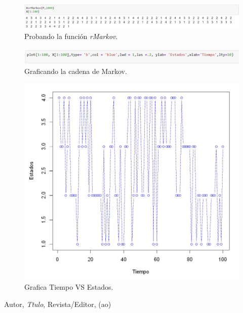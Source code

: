 \documentclass{article}
\theoremstyle{definition}
\theoremstyle{remark}
\begin{document}
\begin{figure}[!h]
	\centering
	\includegraphics[scale=0.55]{fun3}
	\caption{Probando la función \textit{rMarkov}.}
	\label{figura3}
\end{figure}

\begin{figure}[!h]
	\centering
	\includegraphics[scale=0.7]{fun4}
	\caption{Graficando la cadena de Markov.}
	\label{figura4}
\end{figure}

\begin{figure}[!h]
	\centering
	\includegraphics[scale=0.9]{fun5}
	\caption{Grafica Tiempo VS Estados.}
	\label{figura5}
\end{figure}

\begin{thebibliography}{99}

 Autor, \emph{Ttulo}, Revista/Editor, (ao)

\end{thebibliography}
\end{document}
